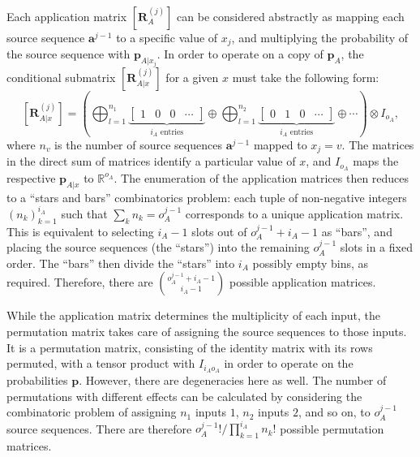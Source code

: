 \documentclass[10pt, a4paper]{article}
\numberwithin{equation}{section} %
\theoremstyle{definition}
\theoremstyle{plain}
\newcommand{\?}{\mathrel{?}} %
\newcommand{\R}{\mathbb{R}} %
\newcommand{\cvec}[1]{\boldsymbol{\mathbf{#1}}}    %
\newcommand{\matr}[2][]{\left[\mathbf{#2}#1\right]} %
\begin{document}
              Each application matrix \(\matr[_{A}^{(j)}]{R}\) can be considered abstractly as mapping each source sequence \(\cvec{a}^{j-1}\) to a specific value of \(x_j\), and multiplying the probability of the source sequence with \(\cvec{p}_{A|x_j}\). In order to operate on a copy of \(\cvec{p}_A\), the conditional submatrix \(\matr[_{A|x}^{(j)}]{R}\) for a given \(x\) must take the following form:
              \begin{equation}
                \matr[_{A|x}^{(j)}]{R} = \left( \bigoplus_{l=1}^{n_1} \underbrace{\begin{bmatrix} 1 & 0 & 0 & \cdots \end{bmatrix}}_{i_A\text{ entries}}
                  \oplus \bigoplus_{l=1}^{n_2} \underbrace{\begin{bmatrix} 0 & 1 & 0 & \cdots \end{bmatrix}}_{i_A\text{ entries}} \oplus \cdots
                \right) \otimes I_{o_A},
                \end{equation}
                where \(n_v\) is the number of source sequences \(\cvec{a}^{j-1}\) mapped to \(x_j = v\). The matrices in the direct sum of matrices identify a particular value of \(x\), and \(I_{o_A}\) maps the respective \(\cvec{p}_{A|x}\) to \(\R^{o_A}\). The enumeration of the application matrices then reduces to a ``stars and bars'' combinatorics problem: each tuple of non-negative integers \({(n_k)}_{k=1}^{i_A}\) such that \( \sum_{k} n_k = o_A^{j-1} \) corresponds to a unique application matrix. This is equivalent to selecting \(i_A-1\) slots out of \(o_A^{j-1}+i_A-1\) as ``bars'', and placing the source sequences (the ``stars'') into the remaining \(o_A^{j-1}\) slots in a fixed order. The ``bars'' then divide the ``stars'' into \(i_A\) possibly empty bins, as required. Therefore, there are \(\binom{o_A^{j-1} + i_A-1}{i_A-1}\) possible application matrices.

                While the application matrix determines the multiplicity of each input, the permutation matrix takes care of assigning the source sequences to those inputs. It is a permutation matrix, consisting of the identity matrix with its rows permuted, with a tensor product with \(I_{i_A o_A}\) in order to operate on the probabilities \(\cvec{p}\). However, there are degeneracies here as well. The number of permutations with different effects can be calculated by considering the combinatoric problem of assigning \(n_1\) inputs \(1\), \(n_2\) inputs \(2\), and so on, to \(o_A^{j-1}\) source sequences. There are therefore \(o_A^{j-1}!/\prod_{k=1}^{i_A} n_k!\) possible permutation matrices.
\end{document}
